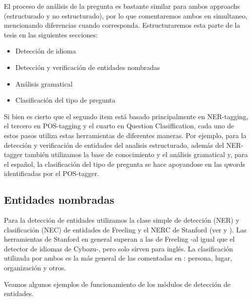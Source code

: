 El proceso de análisis de la pregunta es bastante similar para ambos approachs (estructurado y no estructurado), por lo
que comentaremos ambos en simultaneo, mencionando diferencias cuando corresponda. 
Estructuraremos esta parte de la tesis en las siguientes secciones:

\begin{itemize}
\item Detección de idioma 
\item Detección y verificación de entidades nombradas
\item Análisis gramatical
\item Clasificación del tipo de pregunta
\end{itemize}

Si bien es cierto que el segundo item está basado principalmente en NER-tagging, el tercero en POS-tagging y el cuarto en Question Clasiffication, 
cada uno de estos pasos utiliza estas herramientas de diferentes maneras. Por ejemplo, para la detección y verificación de entidades del analisis estructurado, además del NER-tagger también utilizamos la base de conocimiento y el análisis gramatical y, para el español, la clasificación del tipo de pregunta se hace apoyandose en las qwords identificadas por el POS-tagger.





\subsection{Entidades nombradas}
\label{subsec:impl-ner}

Para la detección de entidades utilizamos la clase simple de detección (NER) y clasificación (NEC) de entidades de Freeling y el NERC de Stanford (ver  y ). Las herramientas de Stanford en general superan a las de Freeling -al igual que el detector de idiomas de Cybozu-, pero solo sirven para inglés. La clasificación utilizada por ambos es la más general de las comentadas en : persona, lugar, organización y otros. 

Veamos algunos ejemplos de funcionamiento de los módulos de detección de entidades. 

